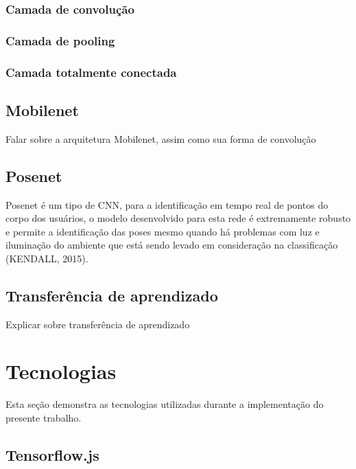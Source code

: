 \subsubsection{Camada de convolução}

\subsubsection{Camada de pooling}

\subsubsection{Camada totalmente conectada} %

\subsection{Mobilenet}

Falar sobre a arquitetura Mobilenet, assim como sua forma de convolução

\subsection{Posenet}

\par Posenet é um tipo de CNN, para a identificação em tempo real de pontos do corpo dos usuários, o modelo desenvolvido para esta rede é extremamente robusto e permite a identificação das poses mesmo quando há problemas com luz e iluminação do ambiente que está sendo levado em consideração na classificação (KENDALL, 2015). 

\subsection{Transferência de aprendizado}

\par Explicar sobre transferência de aprendizado

\section{Tecnologias}

Esta seção demonstra as tecnologias utilizadas durante a implementação do presente trabalho.

\subsection{Tensorflow.js}

